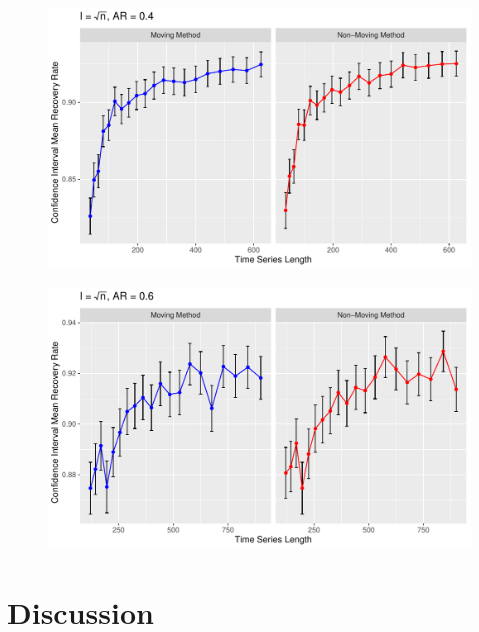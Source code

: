 \documentclass[12pt, letterpaper, titlepage]{article}
\begin{document}
\begin{figure}[tbp]
  \centering
  \includegraphics[width=\textwidth]{root_0.4}
  \caption{}
  \label{fig:root_0.4}
\end{figure}

\begin{figure}[tbp]
  \centering
  \includegraphics[width=\textwidth]{root_0.6}
  \caption{}
  \label{fig:root_0.6}
\end{figure}

\label{sec:results}




\section{Discussion}
\label{sec:discuss}





\end{document}
